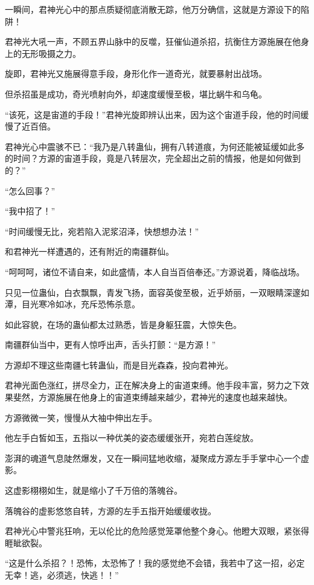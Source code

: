 \begin{this_body}
一瞬间，君神光心中的那点质疑彻底消散无踪，他万分确信，这就是方源设下的陷阱！

君神光大吼一声，不顾五界山脉中的反噬，狂催仙道杀招，抗衡住方源施展在他身上的无形吸摄之力。

旋即，君神光又施展得意手段，身形化作一道奇光，就要暴射出战场。

但杀招虽是成功，奇光喷射向外，却速度缓慢至极，堪比蜗牛和乌龟。

“该死，这是宙道的手段！”君神光旋即辨认出来，因为这个宙道手段，他的时间缓慢了近百倍。

君神光心中震骇不已：“我乃是八转蛊仙，拥有八转道痕，为何还能被延缓如此多的时间？方源的宙道手段，竟是八转层次，完全超出之前的情报，他是如何做到的？”

“怎么回事？”

“我中招了！”

“时间缓慢无比，宛若陷入泥浆沼泽，快想想办法！”

和君神光一样遭遇的，还有附近的南疆群仙。

“呵呵呵，诸位不请自来，如此盛情，本人自当百倍奉还。”方源说着，降临战场。

只见一位蛊仙，白衣飘飘，青发飞扬，面容英俊至极，近乎娇丽，一双眼睛深邃如潭，目光寒冷如冰，充斥恐怖杀意。

如此容貌，在场的蛊仙都太过熟悉，皆是身躯狂震，大惊失色。

南疆群仙当中，更有人惊呼出声，舌头打颤：“是方源！”

方源却不理这些南疆七转蛊仙，而是目光森森，投向君神光。

君神光面色涨红，拼尽全力，正在解决身上的宙道束缚。他手段丰富，努力之下效果斐然，方源施展在他身上的宙道束缚越来越少，君神光的速度也越来越快。

方源微微一笑，慢慢从大袖中伸出左手。

他左手白皙如玉，五指以一种优美的姿态缓缓张开，宛若白莲绽放。

澎湃的魂道气息陡然爆发，又在一瞬间猛地收缩，凝聚成方源左手手掌中心一个虚影。

这虚影栩栩如生，就是缩小了千万倍的落魄谷。

落魄谷的虚影悠悠自转，方源的左手五指开始缓缓收拢。

君神光心中警兆狂响，无以伦比的危险感觉笼罩他整个身心。他瞪大双眼，紧张得睚眦欲裂。

“这是什么杀招？！恐怖，太恐怖了！我的感觉绝不会错，我若中了这一招，必定无幸！逃，必须逃，快逃！！”


\end{this_body}
